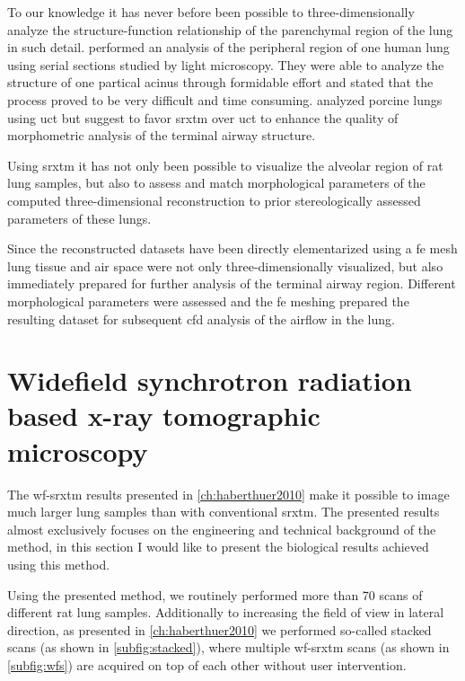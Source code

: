 To our knowledge it has never before been possible to three-dimensionally analyze the structure-function relationship of the parenchymal region of the lung in such detail. \citet{Berend1991} performed an analysis of the peripheral region of one human lung using serial sections studied by light microscopy. They were able to analyze the structure of one partical acinus through formidable effort and stated that the process proved to be very difficult and time consuming. \citet{Litzlbauer2006} analyzed porcine lungs using \ac{uct} but suggest to favor \ac{srxtm} over \ac{uct} to enhance the quality of morphometric analysis of the terminal airway structure.

Using \ac{srxtm} it has not only been possible to visualize the alveolar region of rat lung samples, but also to assess and match morphological parameters of the computed three-dimensional reconstruction to prior stereologically assessed parameters of these lungs.

Since the reconstructed datasets have been directly elementarized using a \ac{fe} mesh lung tissue and air space were not only three-dimensionally visualized, but also immediately prepared for further analysis of the terminal airway region. Different morphological parameters were assessed and the \ac{fe} meshing prepared the resulting dataset for subsequent \ac{cfd} analysis of the airflow in the lung.

\section[WF-SRXTM]{Widefield synchrotron radiation based x-ray tomographic microscopy}
The \ac{wf-srxtm} results presented in \autoref{ch:haberthuer2010} make it possible to image much larger lung samples than with conventional \ac{srxtm}. The presented results almost exclusively focuses on the engineering and technical background of the method, in this section I would like to present the biological results achieved using this method.

Using the presented method, we routinely performed more than 70 scans of different rat lung samples. Additionally to increasing the field of view in lateral direction, as presented in \autoref{ch:haberthuer2010} we performed so-called stacked scans (as shown in \autoref{subfig:stacked}), where multiple \ac{wf-srxtm} scans (as shown in \autoref{subfig:wfs}) are acquired on top of each other without user intervention.

